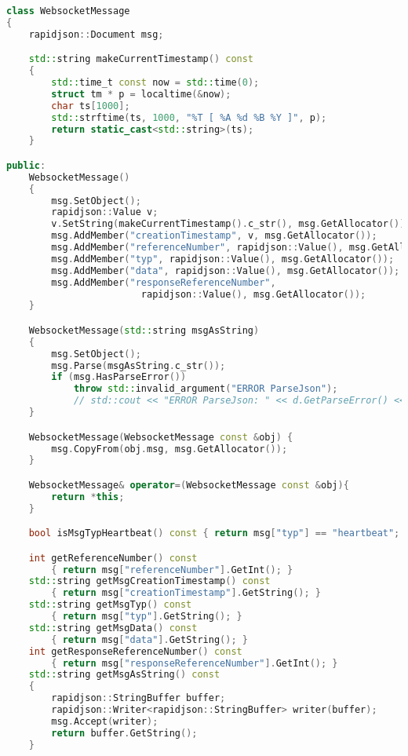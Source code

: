 \documentclass[thesis.tex]{subfiles}
\begin{document}
\begin{lstlisting}[caption={[Nachrichtenklasse im Prototypen]Nachrichtenklasse im Prototypen \lbrack eigene Darstellung\rbrack},captionpos=b,language=C++,label=messageklasse]
class WebsocketMessage
{
    rapidjson::Document msg;

    std::string makeCurrentTimestamp() const
    {
        std::time_t const now = std::time(0);
        struct tm * p = localtime(&now);
        char ts[1000];
        std::strftime(ts, 1000, "%T [ %A %d %B %Y ]", p);
        return static_cast<std::string>(ts);
    }

public:
    WebsocketMessage()
    {
        msg.SetObject();
        rapidjson::Value v;
        v.SetString(makeCurrentTimestamp().c_str(), msg.GetAllocator());
        msg.AddMember("creationTimestamp", v, msg.GetAllocator());
        msg.AddMember("referenceNumber", rapidjson::Value(), msg.GetAllocator());
        msg.AddMember("typ", rapidjson::Value(), msg.GetAllocator());
        msg.AddMember("data", rapidjson::Value(), msg.GetAllocator());
        msg.AddMember("responseReferenceNumber",
                        rapidjson::Value(), msg.GetAllocator());
    }

    WebsocketMessage(std::string msgAsString)
    {
        msg.SetObject();
        msg.Parse(msgAsString.c_str());
        if (msg.HasParseError())
            throw std::invalid_argument("ERROR ParseJson");
            // std::cout << "ERROR ParseJson: " << d.GetParseError() << std::endl;
    }

    WebsocketMessage(WebsocketMessage const &obj) {
        msg.CopyFrom(obj.msg, msg.GetAllocator());
    }

    WebsocketMessage& operator=(WebsocketMessage const &obj){
        return *this;
    }

    bool isMsgTypHeartbeat() const { return msg["typ"] == "heartbeat"; }

    int getReferenceNumber() const
        { return msg["referenceNumber"].GetInt(); }
    std::string getMsgCreationTimestamp() const
        { return msg["creationTimestamp"].GetString(); }
    std::string getMsgTyp() const
        { return msg["typ"].GetString(); }
    std::string getMsgData() const
        { return msg["data"].GetString(); }
    int getResponseReferenceNumber() const
        { return msg["responseReferenceNumber"].GetInt(); }
    std::string getMsgAsString() const
    {
        rapidjson::StringBuffer buffer;
        rapidjson::Writer<rapidjson::StringBuffer> writer(buffer);
        msg.Accept(writer);
        return buffer.GetString();
    }


\end{lstlisting}
\end{document}
